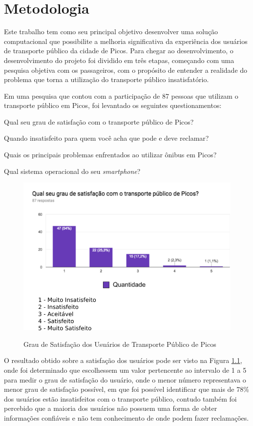 \chapter{Metodologia}\label{cap:metodologia}

Este trabalho tem como seu principal objetivo desenvolver uma solução computacional que possibilite a melhoria significativa da experiência dos usuários de transporte público da cidade de Picos. Para chegar ao desenvolvimento, o desenvolvimento do projeto foi dividido em três etapas, começando com uma pesquisa objetiva com os passageiros, com o propósito de entender a realidade do problema que torna a utilização do transporte público insatisfatório.

Em uma pesquisa que contou com a participação de 87 pessoas que utilizam o transporte público em Picos, foi levantado os seguintes questionamentos:

\begin{lista}
\item Qual seu grau de satisfação com o transporte público de Picos?
\item Quando insatisfeito para quem você acha que pode e deve reclamar?
\item Quais os principais problemas enfrentados ao utilizar ônibus em Picos?
\item Qual sistema operacional do seu \textit{smartphone}?
\end{lista}

\begin{figure}[H]
\caption{Grau de Satisfação dos Usuários de Transporte Público de Picos}
\centering
\includegraphics[width=.8\textwidth]{imagens/satisfacao.png}
\label{fig:satisfacao}
\end{figure}

O resultado obtido sobre a satisfação dos usuários pode ser visto na Figura \ref{fig:satisfacao}, onde foi determinado que escolhessem um valor pertencente ao intervalo de 1 a 5 para medir o grau de satisfação do usuário, onde o menor número representava o menor grau de satisfação possível, em que foi possível identificar que mais de 78\% dos usuários estão insatisfeitos com o transporte público, contudo também foi percebido que a maioria dos usuários não possuem uma forma de obter informações confiáveis e não tem conhecimento de onde podem fazer reclamações.

